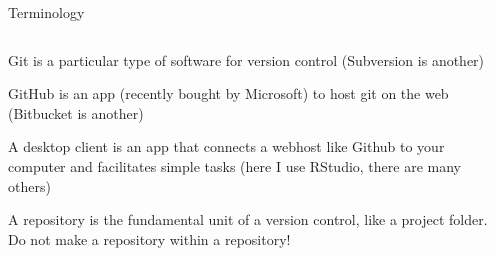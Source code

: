 \documentclass[ignorenonframetext,notes, 10pt, aspectratio=169]{beamer}
\begin{document}
\begin{frame}{Terminology}
\begin{columns}[T]
\begin{column}{0.5\textwidth}
\begin{wideitemize}
\item \alert{Git} is a particular type of software for version control (Subversion is another)
\item \alert{GitHub} is an app (recently bought by Microsoft) to host git on the web (Bitbucket is another)
\item A \alert{desktop client} is an app that connects a webhost like Github to your computer and facilitates simple tasks (here I use \alert{RStudio}, there are many others)
\item A \alert{repository} is the fundamental unit of a version control, like a project folder. \pause Do not make a repository within a repository! 
\end{wideitemize}
\end{column}
\begin{column}{0.5\textwidth}
\end{column}
\end{columns}
\end{frame}
\end{document}
